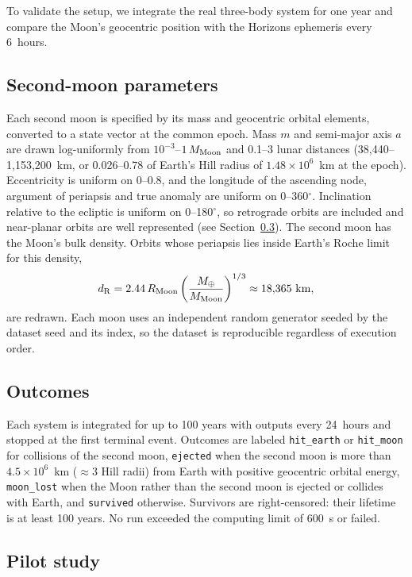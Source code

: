 \documentclass[twocolumn]{aastex631}
\begin{document}
To validate the setup, we integrate the real three-body system for one year and compare the
Moon's geocentric position with the Horizons ephemeris every 6~hours.

\subsection{Second-moon parameters}

Each second moon is specified by its mass and geocentric orbital elements, converted to a state
vector at the common epoch. Mass $m$ and semi-major axis $a$ are drawn log-uniformly from
$10^{-3}$--$1\,M_{\rm Moon}$ and 0.1--3 lunar distances (38,440--1,153,200~km, or 0.026--0.78
of Earth's Hill radius of $1.48\times10^{6}$~km at the epoch). Eccentricity is uniform on
0--0.8, and the longitude of the ascending node, argument of periapsis and true anomaly are
uniform on 0--360$^\circ$. Inclination relative to the ecliptic is uniform on 0--180$^\circ$, so
retrograde orbits are included and near-planar orbits are well represented (see
Section~\ref{sec:pilot}). The second moon has the Moon's bulk density. Orbits whose periapsis lies
inside Earth's Roche limit for this density,
\begin{equation}
d_{\rm R} = 2.44\,R_{\rm Moon}\left(\frac{M_\oplus}{M_{\rm Moon}}\right)^{1/3}
\approx 18{,}365~{\rm km},
\end{equation}
are redrawn. Each moon uses an independent random generator seeded by the dataset seed and its
index, so the dataset is reproducible regardless of execution order.

\subsection{Outcomes}

Each system is integrated for up to 100 years with outputs every 24~hours and stopped at the
first terminal event. Outcomes are labeled \texttt{hit\_earth} or \texttt{hit\_moon} for
collisions of the second moon, \texttt{ejected} when the second moon is more than
$4.5\times10^{6}$~km ($\approx 3$ Hill radii) from Earth with positive geocentric orbital energy,
\texttt{moon\_lost} when the Moon rather than the second moon is ejected or collides with Earth,
and \texttt{survived} otherwise. Survivors are right-censored: their lifetime is at least 100
years. No run exceeded the computing limit of 600~s or failed.

\subsection{Pilot study} \label{sec:pilot}
\end{document}
